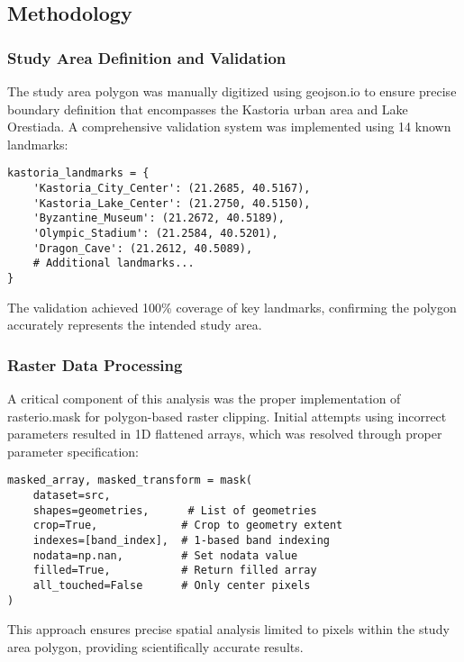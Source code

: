 \documentclass[a4paper,12pt]{article}
\begin{document}
\subsection{Methodology}

\subsubsection{Study Area Definition and Validation}

The study area polygon was manually digitized using geojson.io to ensure
precise boundary definition that encompasses the Kastoria urban area and Lake
Orestiada. A comprehensive validation system was implemented using 14 known
landmarks:

\begin{lstlisting}[caption=Landmark-based polygon validation system]
kastoria_landmarks = {
    'Kastoria_City_Center': (21.2685, 40.5167),
    'Kastoria_Lake_Center': (21.2750, 40.5150),
    'Byzantine_Museum': (21.2672, 40.5189),
    'Olympic_Stadium': (21.2584, 40.5201),
    'Dragon_Cave': (21.2612, 40.5089),
    # Additional landmarks...
}
\end{lstlisting}

The validation achieved 100\% coverage of key landmarks, confirming the polygon
accurately represents the intended study area.

\subsubsection{Raster Data Processing}

A critical component of this analysis was the proper implementation of
rasterio.mask for polygon-based raster clipping. Initial attempts using
incorrect parameters resulted in 1D flattened arrays, which was resolved
through proper parameter specification:

\begin{lstlisting}[caption=Correct rasterio.mask implementation]
masked_array, masked_transform = mask(
    dataset=src,
    shapes=geometries,      # List of geometries
    crop=True,             # Crop to geometry extent  
    indexes=[band_index],  # 1-based band indexing
    nodata=np.nan,         # Set nodata value
    filled=True,           # Return filled array
    all_touched=False      # Only center pixels
)
\end{lstlisting}

This approach ensures precise spatial analysis limited to pixels within the
study area polygon, providing scientifically accurate results.
\end{document}
